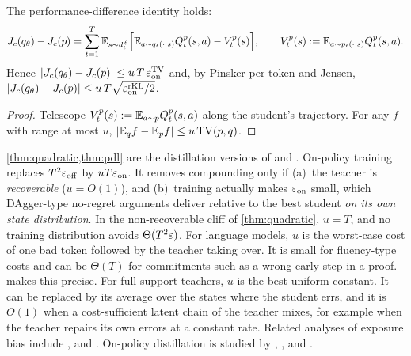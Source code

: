 \begin{theorem}\label{thm:pdl}
\Pv\Ck The performance-difference identity \citep{kakade2002approximately} holds:
\[
J_c(q_\theta)-J_c(p)=\sum_{t=1}^T\mathbb{E}_{s\sim d^{\,\theta}_{t}}\Big[\mathbb{E}_{a\sim q_t(\cdot\mid s)}Q^p_t(s,a)-V^p_t(s)\Big],\qquad V^p_t(s):=\mathbb{E}_{a\sim p_t(\cdot\mid s)}Q^p_t(s,a).
\]
Hence $|J_c(q_\theta)-J_c(p)|\le u\,T\,\varepsilon_{\mathrm{on}}^{\mathrm{TV}}$ and, by Pinsker per token and Jensen,
$|J_c(q_\theta)-J_c(p)|\le u\,T\sqrt{\varepsilon_{\mathrm{on}}^{\mathrm{rKL}}/2}$.
\end{theorem}
\begin{proof}
Telescope $V^p_t(s):=\mathbb{E}_{a\sim p}Q^p_t(s,a)$ along the student's trajectory. For any $f$ with range at most
$u$, $|\mathbb{E}_qf-\mathbb{E}_pf|\le u\,\mathrm{TV}(p,q)$.
\end{proof}
\begin{remark}\label{rem:onpolicy}
\cref{thm:quadratic,thm:pdl} are the distillation versions of \citet{ross2010efficient} and
\citet{ross2011reduction}. On-policy training replaces $T^2\varepsilon_{\mathrm{off}}$ by $uT\varepsilon_{\mathrm{on}}$. It removes compounding
only if (a)~the teacher is \emph{recoverable} ($u=O(1)$), and (b)~training actually makes $\varepsilon_{\mathrm{on}}$ small,
which DAgger-type no-regret arguments deliver relative to the best student \emph{on its own state
distribution}. In the non-recoverable cliff of \cref{thm:quadratic}, $u=T$, and no training distribution
avoids $\Theta(T^2\varepsilon)$. For language models, $u$ is the worst-case cost of one bad token followed by
the teacher taking over. It is small for fluency-type costs and can be $\Theta(T)$ for commitments such
as a wrong early step in a proof.  makes this precise. For full-support teachers, $u$ is the
best uniform constant. It can be replaced by its average over the states where the student errs, and it is
$O(1)$ when a cost-sufficient latent chain of the teacher mixes, for example when the teacher repairs its own
errors at a constant rate. Related analyses of exposure bias include \citet{bengio2015scheduled},
\citet{ranzato2016sequence} and \citet{arora2022exposure}. On-policy distillation is studied by
\citet{lin2020autoregressive}, \citet{gu2024minillm}, \citet{agarwal2024gkd} and \citet{ko2024distillm}.
\end{remark}

